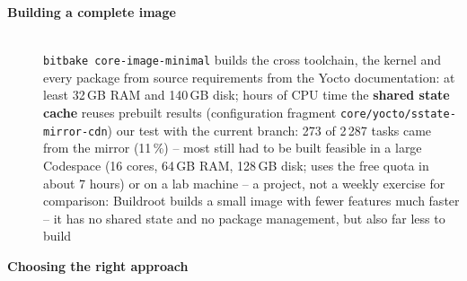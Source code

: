 \begin{description}
\item[{\rot\bf Building a complete image}]~\\[-\lblskip]
\bi
	\ite \texttt{bitbake core-image-minimal} builds the cross toolchain, the kernel and every package from source
	\ite requirements from the Yocto documentation: at least 32\,GB RAM and 140\,GB disk; hours of CPU time
	\ite the \textbf{shared state cache} reuses prebuilt results (configuration fragment \texttt{core/yocto/sstate-mirror-cdn})
	\bi
		\ite our test with the current branch: 273 of 2\,287 tasks came from the mirror (11\,\%) -- most still had to be built
	\ei
	\ite feasible in a large Codespace (16 cores, 64\,GB RAM, 128\,GB disk; uses the free quota in about 7 hours) or on a lab machine -- a project, not a weekly exercise
	\ite for comparison: Buildroot builds a small image with fewer features much faster -- it has no shared state and no package management, but also far less to build
\ei
\os{\newpage}

\item[{\rot\bf Choosing the right approach}]~\\[-\lblskip]
\begin{center}
\end{center}
\os{\newpage}


\end{description}
